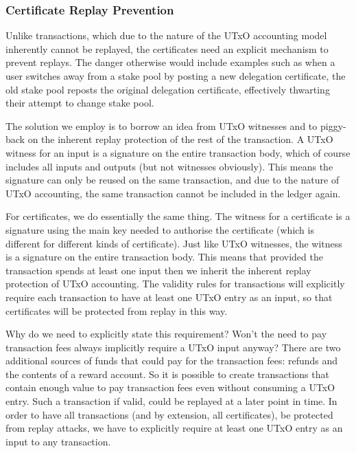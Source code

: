 \documentclass[11pt,a4paper]{article}
\begin{document}
\subsubsection{Certificate Replay Prevention}
\label{certificate-replay-prevention}

Unlike transactions, which due to the nature of the UTxO accounting
model inherently cannot be replayed, the certificates need an explicit
mechanism to prevent replays. The danger otherwise would include
examples such as when a user switches away from a stake pool by posting
a new delegation certificate, the old stake pool reposts the original
delegation certificate, effectively thwarting their attempt to change
stake pool.

The solution we employ is to borrow an idea from UTxO witnesses and to
piggy-back on the inherent replay protection of the rest of the
transaction. A UTxO witness for an input is a signature on the entire
transaction body, which of course includes all inputs and outputs (but
not witnesses obviously). This means the signature can only be reused
on the same transaction, and due to the nature of UTxO accounting, the
same transaction cannot be included in the ledger again.

For certificates, we do essentially the same thing. The witness for a
certificate is a signature using the main key needed to authorise the
certificate (which is different for different kinds of certificate).
Just like UTxO witnesses, the witness is a signature on the entire
transaction body. This means that provided the transaction spends at
least one input then we inherit the inherent replay protection of UTxO
accounting. The validity rules for transactions will explicitly require each
transaction to have at least one UTxO entry as an input, so that certificates
will be protected from replay in this way.

Why do we need to explicitly state this requirement? Won't the need to pay
transaction fees always implicitly require a UTxO input anyway? There are two
additional sources of funds that could pay for the transaction fees: refunds and
the contents of a reward account. So it is possible to create transactions that
contain enough value to pay transaction fees even without consuming a UTxO
entry. Such a transaction if valid, could be replayed at a later point in time.
In order to have all transactions (and by extension, all certificates), be
protected from replay attacks, we have to explicitly require at least one UTxO
entry as an input to any transaction.
\end{document}
